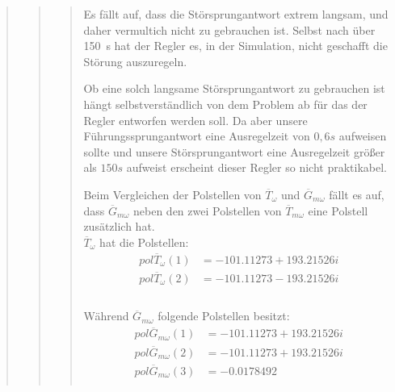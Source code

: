 \begin{quote}
\begin{quote}
\begin{quote}
            Es fällt auf, dass die Störsprungantwort extrem langsam, und daher vermultich nicht zu gebrauchen ist. Selbst
            nach über \SI{150}{s} hat der Regler es, in der Simulation, nicht geschafft die Störung auszuregeln.\vspace{1em}
             
            Ob eine solch langsame Störsprungantwort zu gebrauchen ist hängt selbstverständlich von dem Problem ab für
            das der Regler entworfen werden soll. Da aber unsere Führungssprungantwort eine Ausregelzeit von $0,6s$
            aufweisen sollte und unsere Störsprungantwort eine Ausregelzeit größer als $150 s$ aufweist erscheint
            dieser Regler so nicht praktikabel.\vspace{1em}
             
            Beim Vergleichen der Polstellen von $\overline{T}_\omega$ und $\overline{G}_{m\omega}$ fällt es auf, dass
            $\overline{G}_{m\omega}$ neben den zwei Polstellen von $\overline{T}_{m\omega}$ eine Polstell zusätzlich hat.\\
            
            $\overline{T}_\omega$ hat die Polstellen:\\
            \begin{equation*}
            	\begin{split}
                    pol \overline{T}_\omega (1) &= - 101.11273 + 193.21526i\\
                    pol \overline{T}_\omega (2) &= - 101.11273 - 193.21526i\\            		
            	\end{split}
            \end{equation*}\\
            
             Während $\overline{G}_{m\omega}$ folgende Polstellen besitzt:\\
             
            \begin{equation*}
            	\begin{split}
                    pol \overline{G}_{m\omega} (1) &= - 101.11273 + 193.21526i\\
                    pol \overline{G}_{m\omega} (2) &= - 101.11273 + 193.21526i\\                   
                    pol \overline{G}_{m\omega} (3) &= - 0.0178492\\            		
            	\end{split}
            \end{equation*}
            

\end{quote}
\end{quote}
\end{quote}
